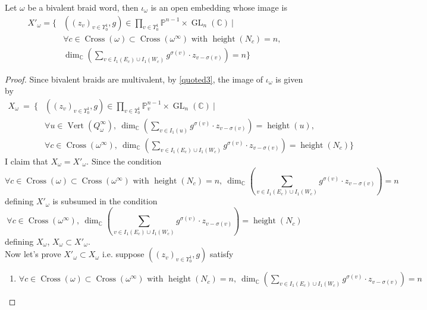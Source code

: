 \begin{theorem}
	Let $\omega$ be a bivalent braid word, then $\iota_\omega$ is an open embedding whose image is 
\begin{align*}
X'_\omega =\{ &((z_v)_{v\in\Upsilon_0^1},g)\in \prod_{v\in \Upsilon_0^1} \mathbb{P}^{n-1} \times \operatorname{GL}_n(\mathbb{C})~|\\
&\forall c\in \operatorname{Cross}(\omega)\subset \operatorname{Cross}(\omega^\infty)\text{ with } \operatorname{height}(N_c)=n,\\
& \operatorname{dim}_\mathbb{C}(\sum_{v\in I_1(E_c)\cup I_1(W_c)}g^{\sigma(v)}\cdot z_{v-\sigma(v)}) = n\}
\end{align*}
\end{theorem}
\begin{proof}
Since bivalent braids are multivalent, by \ref{quoted3}, the image of $\iota_\omega$ is given by 
\begin{align*}
X_\omega~=~\{ &((z_v)_{v\in \Upsilon_0^1},g)\in \prod_{v\in\Upsilon_0^1}\mathbb{P}_v^{n-1}\times \operatorname{GL}_n(\mathbb{C})~|\\
& \forall u\in \operatorname{Vert}(Q_\omega^\infty),~\operatorname{dim}_\mathbb{C}(\sum_{v\in I_1(u)} g^{\sigma(v)}\cdot z_{v-\sigma(v)}) = \operatorname{height}(u),\\
& \forall c\in \operatorname{Cross}(\omega^\infty),~\operatorname{dim}_\mathbb{C}(\sum_{v\in I_1(E_c)\cup I_1(W_c)} g^{\sigma(v)}\cdot z_{v-\sigma(v)}) = \operatorname{height}(N_c)\}
\end{align*}
I claim that $X_\omega = X'_\omega$. Since the condition
\[
\forall c\in \operatorname{Cross}(\omega)\subset \operatorname{Cross}(\omega^\infty)\text{ with } \operatorname{height}(N_c)=n, ~ \operatorname{dim}_\mathbb{C}(\sum_{v\in I_1(E_c)\cup I_1(W_c)}g^{\sigma(v)}\cdot z_{v-\sigma(v)}) = n
\]
defining $X'_\omega$ is subsumed in the condition
\[
\forall c\in \operatorname{Cross}(\omega^\infty),~\operatorname{dim}_\mathbb{C}(\sum_{v\in I_1(E_c)\cup I_1(W_c)} g^{\sigma(v)}\cdot z_{v-\sigma(v)}) = \operatorname{height}(N_c)
\]
defining $X_\omega$, $X_\omega \subset X'_\omega$.\\
Now let's prove $X'_\omega \subset X_\omega$ i.e. suppose $((z_v)_{v\in \Upsilon_0^1},g)$ satisfy
\begin{enumerate}[label = (\roman*)]
\item $\forall c\in \operatorname{Cross}(\omega)\subset \operatorname{Cross}(\omega^\infty)\text{ with } \operatorname{height}(N_c)=n, ~ \operatorname{dim}_\mathbb{C}(\sum_{v\in I_1(E_c)\cup I_1(W_c)}g^{\sigma(v)}\cdot z_{v-\sigma(v)}) = n$\\

\end{enumerate}
\end{proof}
